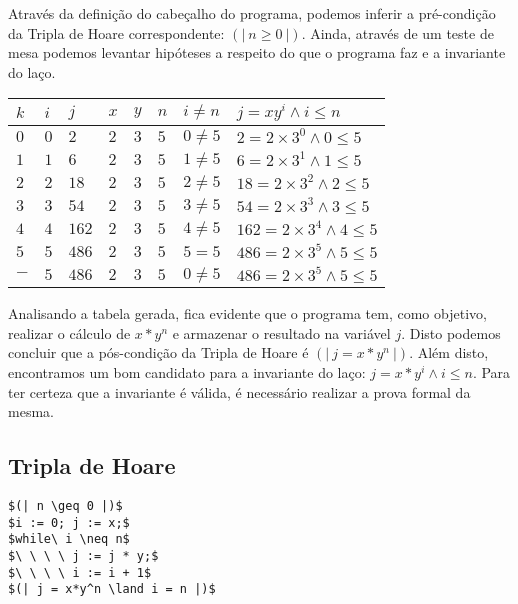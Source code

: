 \documentclass[12pt]{article}
\begin{document}
Através da definição do cabeçalho do programa, podemos inferir a pré-condição da Tripla de Hoare correspondente: $(|\ n \geq 0\ |)$. Ainda, através de um teste de
mesa podemos levantar hipóteses a respeito do que o programa faz e a invariante do laço.

\begin{table}[h]
\begin{tabular}{|l|l|l|l|l|l|l|l|}
\hline
$k$ & $i$ & $j$   & $x$ & $y$ & $n$ & $i \neq n$ & $j=xy^i \land i \leq n $ \\ \hline
$0$ & $0$ & $2$   & $2$ & $3$ & $5$ & $0 \neq 5$ & $2=2   \times 3^0 \land 0 \leq 5 $ \\ \hline
$1$ & $1$ & $6$   & $2$ & $3$ & $5$ & $1 \neq 5$ & $6=2   \times 3^1 \land 1 \leq 5 $ \\ \hline
$2$ & $2$ & $18$  & $2$ & $3$ & $5$ & $2 \neq 5$ & $18=2  \times 3^2 \land 2 \leq 5 $ \\ \hline
$3$ & $3$ & $54$  & $2$ & $3$ & $5$ & $3 \neq 5$ & $54=2  \times 3^3 \land 3 \leq 5 $ \\ \hline
$4$ & $4$ & $162$ & $2$ & $3$ & $5$ & $4 \neq 5$ & $162=2 \times 3^4 \land 4 \leq 5 $ \\ \hline
$5$ & $5$ & $486$ & $2$ & $3$ & $5$ & $5  =   5$  & $486=2 \times 3^5 \land 5 \leq 5 $ \\ \hline
$-$ & $5$ & $486$ & $2$ & $3$ & $5$ & $0 \neq 5$ & $486=2 \times 3^5 \land 5 \leq 5 $ \\ \hline
\end{tabular}
\end{table}

Analisando a tabela gerada, fica evidente que o programa tem, como objetivo, realizar o cálculo de $x*y^n$ e armazenar o resultado na variável $j$. Disto podemos concluir que a pós-condição
da Tripla de Hoare é $(|\ j = x*y^n\ |)$. Além disto, encontramos um bom candidato para a invariante do laço: $j = x * y^i \land i \leq n$. Para ter certeza que a
invariante é válida, é necessário realizar a prova formal da mesma.

\subsection{Tripla de Hoare}

\begin{lstlisting}
$(| n \geq 0 |)$
$i := 0; j := x;$
$while\ i \neq n$
$\ \ \ \ j := j * y;$
$\ \ \ \ i := i + 1$
$(| j = x*y^n \land i = n |)$
\end{lstlisting}
\end{document}
